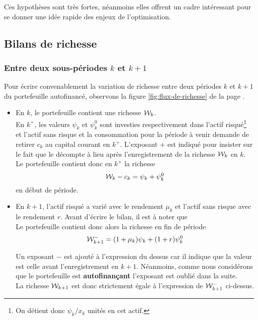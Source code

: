 \documentclass{article}
\numberwithin{equation}{section}
\begin{document}
Ces hypothèses sont très fortes, néanmoins elles offrent un cadre intéressant pour se donner une idée rapide des enjeux de l'optimisation.\\

\subsection{Bilans de richesse}

\subsubsection{Entre deux sous-périodes $k$ et $k + 1$}

Pour écrire convenablement la variation de richesse entre deux périodes $k$ et $k + 1$ du portefeuille autofinancé, observons la figure \ref{fig:flux-de-richesse} de la page \pageref{fig:flux-de-richesse}. 
\begin{itemize}
\item En $k$, le portefeuille contient une richesse $\mathcal{W}_k$.\\

En $k^+$, les valeurs $\psi_k$ et $\psi_k^0$ sont investies respectivement dans l'actif risqué\footnote{On détient donc $\psi_k/x_k$ unités en cet actif.} et l'actif sans risque et la consommation pour la période à venir demande de retirer $c_k$ au capital courant en $k^+$. L'exposant $+$ est indiqué pour insister sur le fait que le décompte à lieu après l'enregistrement de la richesse $\mathcal{W}_k$ en $k$.\\

Le portefeuille contient donc en $k^+$ la richesse
$$
\mathcal{W}_k - c_k = \psi_k + \psi_k^0
$$
en début de période.

\item En $k + 1$, l'actif risqué a varié avec le rendement $\mu_k$ et l'actif sans risque avec le rendement $r$. Avant d'écrire le bilan, il est à noter que \\

Le portefeuille contient donc alors la richesse en fin de période
$$
\mathcal{W}^-_{k+1} = (1 + \mu_k)\psi_k + (1 + r)\psi_k^0
$$

Un exposant $-$ est ajouté à l'expression du dessus car il indique que la valeur est celle avant l'enregistrement en $k + 1$. Néanmoins, comme nous considérons que le portefeuille est \textbf{autofinançant} l'exposant est oublié dans la suite.\\

La richesse $\mathcal{W}_{k + 1}$ est donc strictement égale à l'expression de $\mathcal{W}_{k + 1}^-$ ci-dessus.

\end{itemize}
\end{document}
